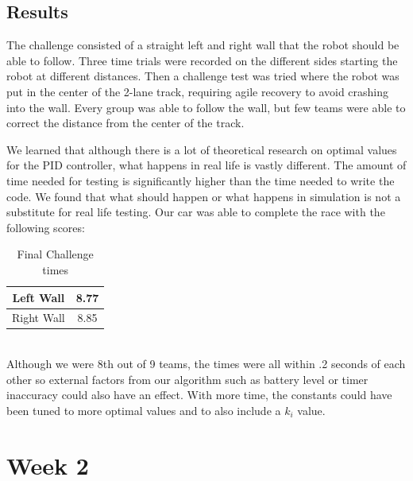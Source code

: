 \documentclass[journal, a4paper]{IEEEtran}
\begin{document}
\subsection{Results}
The challenge consisted of a straight left and right wall that the robot should be able to follow. Three time trials were recorded on the different sides starting the robot at different distances. Then a challenge test was tried where the robot was put in the center of the 2-lane track, requiring agile recovery to avoid crashing into the wall. Every group was able to follow the wall, but few teams were able to correct the distance from the center of the track. 
\par We learned that although there is a lot of theoretical research on optimal values for the PID controller, what happens in real life is vastly different. The amount of time needed for testing is significantly higher than the time needed to write the code. We found that what should happen or what happens in simulation is not a substitute for real life testing. Our car was able to complete the race with the following scores: \\
    \begin{table}[!hbt]
        \begin{center}
        \caption{Final Challenge times}
        \begin{tabular}{|c|c|}
            \hline
            Left Wall & 8.77 \\
            \hline
            Right Wall & 8.85 \\
            \hline
        \end{tabular}
        \end{center}
    \end{table} \\
Although we were 8th out of 9 teams, the times were all within .2 seconds of each other so external factors from our algorithm such as battery level or timer inaccuracy could also have an effect. With more time, the constants could have been tuned to more optimal values and to also include a $k_i$ value.
\section{Week 2}
\end{document}
